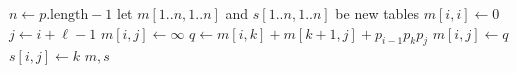 \begin{algorithmic}
\State $n \gets p.\text{length} - 1$
\State let $m[1..n,1..n]$ and $s[1..n,1..n]$ be new tables
  \State $m[i,i] \gets 0$
\EndFor
{} 
    \State $j \gets i + \ell - 1$
    \State $m[i,j] \gets \infty$
      \State $q \gets m[i,k] + m[k+1,j] + p_{i-1}p_kp_j$
        \State $m[i,j] \gets q$
        \State $s[i,j] \gets k$
      \EndIf
    \EndFor
  \EndFor
\EndFor
\State \Return $m, s$
\EndFunction
\end{algorithmic}